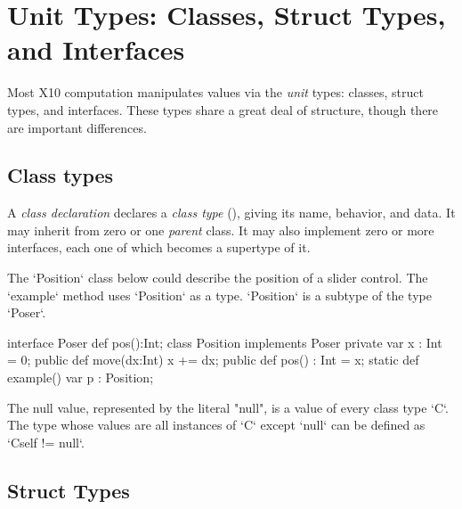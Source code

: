 \section{Unit Types: Classes, Struct Types,  and Interfaces}
\label{ReferenceTypes}

Most X10 computation manipulates values via the {\em unit} types: classes,
struct types, and interfaces.  These types share a great deal of structure,
though there are important differences. 


\subsection{Class types}



A {\em class declaration}  declares a {\em class type} (),
giving its name, behavior, and data.  It may inherit from zero or one {\em parent}
class.  It may also implement zero or more interfaces, each
one of which becomes a supertype of it.

\begin{ex}
The \xcd`Position` class below could describe the position of a slider
control.  The \xcd`example` method uses \xcd`Position` as a type.
\xcd`Position` is a subtype of the type
\xcd`Poser`. 
\begin{xten}
interface Poser {
  def pos():Int;
  }
class Position implements Poser {
  private var x : Int = 0;
  public def move(dx:Int) { x += dx; }
  public def pos() : Int = x;
  static def example() {
    var p : Position; 
  }
}
\end{xten}
%
\end{ex}





The null value, represented by the literal
\xcd"null", is a value of every class type \xcd`C`. The type whose values are
all instances of \xcd`C` except 
\xcd`null` can be defined as \xcd`C{self != null}`.

\subsection{Struct Types}

